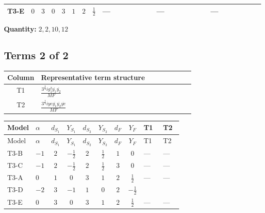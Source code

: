 \documentclass[8pt]{article}
\begin{document}
\begin{landscape}
\begin{longtable}{@{}llcccccc >{\raggedright\arraybackslash}p{0.21\linewidth} >{\raggedright\arraybackslash}p{0.21\linewidth} >{\raggedright\arraybackslash}p{0.21\linewidth}@{}}
\midrule
T3-E & $0$ & $3$ & $0$ & $3$ & $1$ & $2$ & $\frac{1}{2}$ & --- & --- & --- \\
\midrule
\bottomrule
\end{longtable}
\clearpage
\noindent\textbf{Quantity: }$\mathrm{2,2,10,12}$\par\smallskip
\subsection*{Terms 2 of 2}
\begin{center}
\begin{tabular}{@{}c >{\raggedright\arraybackslash}p{0.82\linewidth}@{}}
\toprule
Column & Representative term structure \\
\midrule
T1 & \(\displaystyle \frac{3^{\frac{3}{4}} i g_{1}^{2} \overline{y_{1}} \overline{y_{2}}}{MF}\) \\
\midrule
T2 & \(\displaystyle \frac{3^{\frac{3}{4}} i ye \overline{y_{1}} \overline{y_{2}} \overline{ye}}{MF}\) \\
\midrule
\bottomrule
\end{tabular}
\end{center}
\smallskip
\tiny
\begin{longtable}{@{}llcccccc >{\raggedright\arraybackslash}p{0.21\linewidth} >{\raggedright\arraybackslash}p{0.21\linewidth}@{}}
\toprule
Model & $\alpha$ & $d_{S_1}$ & $Y_{S_1}$ & $d_{S_2}$ & $Y_{S_2}$ & $d_F$ & $Y_F$ & T1 & T2 \\
\midrule
\endfirsthead
\toprule
Model & $\alpha$ & $d_{S_1}$ & $Y_{S_1}$ & $d_{S_2}$ & $Y_{S_2}$ & $d_F$ & $Y_F$ & T1 & T2 \\
\midrule
\endhead
T3-B & $-1$ & $2$ & $-\frac{1}{2}$ & $2$ & $\frac{1}{2}$ & $1$ & $0$ & --- & --- \\
\midrule
T3-C & $-1$ & $2$ & $-\frac{1}{2}$ & $2$ & $\frac{1}{2}$ & $3$ & $0$ & --- & --- \\
\midrule
T3-A & $0$ & $1$ & $0$ & $3$ & $1$ & $2$ & $\frac{1}{2}$ & --- & --- \\
\midrule
T3-D & $-2$ & $3$ & $-1$ & $1$ & $0$ & $2$ & $-\frac{1}{2}$ & \scriptsize\adjustbox{max width=\linewidth}{$\begin{gathered} - \frac{3^{\frac{3}{4}} i g_{1}^{2} \overline{y_{1}} \overline{y_{2}}}{8 MF}\end{gathered}$} & \scriptsize\adjustbox{max width=\linewidth}{$\begin{gathered} \frac{3^{\frac{3}{4}} i ye \overline{y_{1}} \overline{y_{2}} \overline{ye}}{12 MF}\end{gathered}$} \\
\midrule
T3-E & $0$ & $3$ & $0$ & $3$ & $1$ & $2$ & $\frac{1}{2}$ & --- & --- \\
\midrule
\bottomrule
\end{longtable}
\clearpage

\end{landscape}
\end{document}
